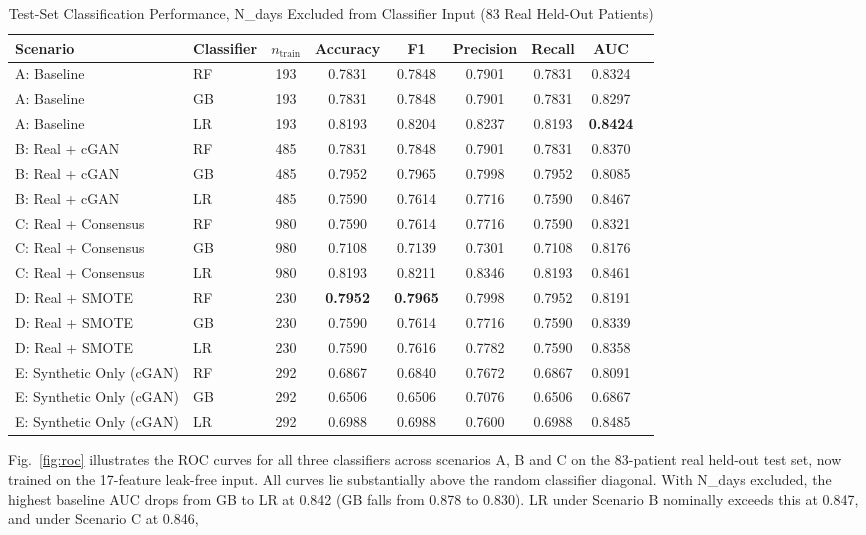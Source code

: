 \begin{table}[t]
  \centering
  \caption{Test-Set Classification Performance, N\_days Excluded from Classifier Input (83 Real Held-Out Patients)}
  \label{tab:performance}
  \begin{tabular}{llccccccc}
    \toprule
    Scenario & Classifier & $n_{\text{train}}$ & Accuracy & F1 & Precision & Recall & AUC \\
    \midrule
    A: Baseline       & RF      & 193 & 0.7831 & 0.7848 & 0.7901 & 0.7831 & 0.8324 \\
    A: Baseline       & GB  & 193 & 0.7831 & 0.7848 & 0.7901 & 0.7831 & 0.8297 \\
    A: Baseline       & LR & 193 & 0.8193 & 0.8204 & 0.8237 & 0.8193 & \textbf{0.8424} \\
    \midrule
    B: Real + cGAN   & RF      & 485 & 0.7831 & 0.7848 & 0.7901 & 0.7831 & 0.8370 \\
    B: Real + cGAN   & GB  & 485 & 0.7952 & 0.7965 & 0.7998 & 0.7952 & 0.8085 \\
    B: Real + cGAN   & LR & 485 & 0.7590 & 0.7614 & 0.7716 & 0.7590 & 0.8467 \\
    \midrule
    C: Real + Consensus & RF    & 980 & 0.7590 & 0.7614 & 0.7716 & 0.7590 & 0.8321 \\
    C: Real + Consensus & GB& 980 & 0.7108 & 0.7139 & 0.7301 & 0.7108 & 0.8176 \\
    C: Real + Consensus & LR & 980 & 0.8193 & 0.8211 & 0.8346 & 0.8193 & 0.8461 \\
    \midrule
    D: Real + SMOTE   & RF      & 230 & \textbf{0.7952} & \textbf{0.7965} & 0.7998 & 0.7952 & 0.8191 \\
    D: Real + SMOTE   & GB  & 230 & 0.7590 & 0.7614 & 0.7716 & 0.7590 & 0.8339 \\
    D: Real + SMOTE   & LR & 230 & 0.7590 & 0.7616 & 0.7782 & 0.7590 & 0.8358 \\
    \midrule
    E: Synthetic Only (cGAN) & RF      & 292 & 0.6867 & 0.6840 & 0.7672 & 0.6867 & 0.8091 \\
    E: Synthetic Only (cGAN) & GB  & 292 & 0.6506 & 0.6506 & 0.7076 & 0.6506 & 0.6867 \\
    E: Synthetic Only (cGAN) & LR & 292 & 0.6988 & 0.6988 & 0.7600 & 0.6988 & 0.8485 \\
    \bottomrule
  \end{tabular}
\end{table}

Fig.~\ref{fig:roc} illustrates the ROC curves for all three classifiers across scenarios A, B and C on the 83-patient real held-out test set, now trained on the 17-feature leak-free input. All curves lie substantially above the random classifier diagonal. With N\_days excluded, the highest baseline AUC drops from GB to LR at 0.842 (GB falls from 0.878 to 0.830). LR under Scenario B nominally exceeds this at 0.847, and under Scenario C at 0.846, 


